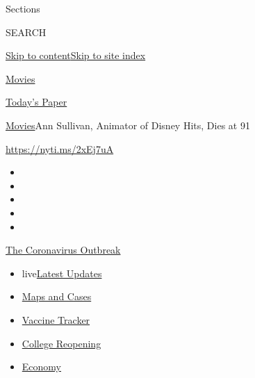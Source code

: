 Sections

SEARCH

\protect\hyperlink{site-content}{Skip to
content}\protect\hyperlink{site-index}{Skip to site index}

\href{https://www.nytimes3xbfgragh.onion/section/movies}{Movies}

\href{https://myaccount.nytimes3xbfgragh.onion/auth/login?response_type=cookie\&client_id=vi}{}

\href{https://www.nytimes3xbfgragh.onion/section/todayspaper}{Today's
Paper}

\href{/section/movies}{Movies}\textbar{}Ann Sullivan, Animator of Disney
Hits, Dies at 91

\url{https://nyti.ms/2xEj7uA}

\begin{itemize}
\item
\item
\item
\item
\item
\end{itemize}

\href{https://www.nytimes3xbfgragh.onion/news-event/coronavirus?action=click\&pgtype=Article\&state=default\&region=TOP_BANNER\&context=storylines_menu}{The
Coronavirus Outbreak}

\begin{itemize}
\tightlist
\item
  live\href{https://www.nytimes3xbfgragh.onion/2020/08/04/world/coronavirus-covid-19.html?action=click\&pgtype=Article\&state=default\&region=TOP_BANNER\&context=storylines_menu}{Latest
  Updates}
\item
  \href{https://www.nytimes3xbfgragh.onion/interactive/2020/us/coronavirus-us-cases.html?action=click\&pgtype=Article\&state=default\&region=TOP_BANNER\&context=storylines_menu}{Maps
  and Cases}
\item
  \href{https://www.nytimes3xbfgragh.onion/interactive/2020/science/coronavirus-vaccine-tracker.html?action=click\&pgtype=Article\&state=default\&region=TOP_BANNER\&context=storylines_menu}{Vaccine
  Tracker}
\item
  \href{https://www.nytimes3xbfgragh.onion/2020/08/02/us/covid-college-reopening.html?action=click\&pgtype=Article\&state=default\&region=TOP_BANNER\&context=storylines_menu}{College
  Reopening}
\item
  \href{https://www.nytimes3xbfgragh.onion/live/2020/08/03/business/stock-market-today-coronavirus?action=click\&pgtype=Article\&state=default\&region=TOP_BANNER\&context=storylines_menu}{Economy}
\end{itemize}

